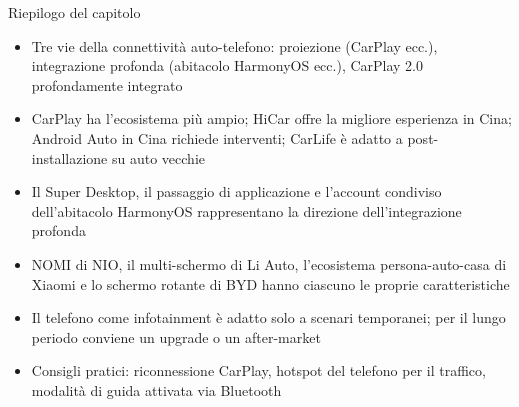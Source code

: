 \begin{tcbsummary}{Riepilogo del capitolo}
\begin{itemize}
  \item Tre vie della connettività auto-telefono: proiezione (CarPlay ecc.), integrazione profonda (abitacolo HarmonyOS ecc.), CarPlay 2.0 profondamente integrato
  \item CarPlay ha l'ecosistema più ampio; HiCar offre la migliore esperienza in Cina; Android Auto in Cina richiede interventi; CarLife è adatto a post-installazione su auto vecchie
  \item Il Super Desktop, il passaggio di applicazione e l'account condiviso dell'abitacolo HarmonyOS rappresentano la direzione dell'integrazione profonda
  \item NOMI di NIO, il multi-schermo di Li Auto, l'ecosistema persona-auto-casa di Xiaomi e lo schermo rotante di BYD hanno ciascuno le proprie caratteristiche
  \item Il telefono come infotainment è adatto solo a scenari temporanei; per il lungo periodo conviene un upgrade o un after-market
  \item Consigli pratici: riconnessione CarPlay, hotspot del telefono per il traffico, modalità di guida attivata via Bluetooth
\end{itemize}

\end{tcbsummary}
